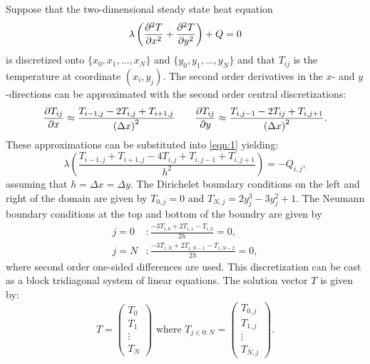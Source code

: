 \documentclass[reqno, 12pt]{amsart}
\begin{document}
    \noindent Suppose that the two-dimensional steady state heat equation
    \begin{equation}
        \lambda\left(\pdifftwo[T]{x} + \pdifftwo[T]{y}\right) + Q = 0 \label{eqn:1}
    \end{equation}
    is discretized onto $\{x_0, x_1, \dots, x_N\}$ and $\{y_0, y_1, \dots, y_N\}$ and that $T_{ij}$ is the temperature at coordinate $(x_i, y_j)$.
    The second order derivatives in the $x$- and $y$-directions can be approximated with the second order central discretizations:
    \begin{equation*}
        \pdiff[T_{ij}]{x} \approx \frac{T_{i-1,j} - 2 T_{i,j} + T_{i + 1,j}}{\left(\Delta x\right)^2}
        \qquad
        \pdiff[T_{ij}]{y} \approx \frac{T_{i, j-1} - 2T_{ij} + T_{i, j + 1}}{\left(\Delta x\right)^2}.
    \end{equation*}
    These approximations can be substituted into \cref{eqn:1} yielding:
    \begin{equation*}
        \lambda\left(\frac{T_{i-1,j} + T_{i + 1,j} - 4T_{i,j} + T_{i,j-1} + T_{i,j + 1}}{h^2}\right) = -Q_{i,j},
    \end{equation*}
    assuming that $h = \Delta x = \Delta y$.
    The Dirichelet boundary conditions on the left and right of the domain are given by $T_{0,j} = 0$ and $T_{N,j} = 2y_j^3 - 3y_j^2 + 1$.
    The Neumann boundary conditions at the top and bottom of the boundry are given by
    \begin{align*}
        j = 0&: \frac{-3T_{i,0} + 2T_{i,1} - T_{i,2}}{2h}= 0, \\
        j = N&: \frac{-3T_{i,N} + 2T_{i,N-1} - T_{i,N-2}}{2h} = 0,
    \end{align*}
    where second order one-sided differences are used.
    This discretization can be cast as a block tridiagonal system of linear equations.
    The solution vector $T$ is given by:
    \begin{equation*}
        T = \begin{pmatrix} T_0 \\ T_1 \\ \vdots \\ T_N \end{pmatrix}
        \text{ where }
        T_{j\in 0:N} = \begin{pmatrix} T_{0,j} \\ T_{1,j} \\ \vdots \\ T_{N,j} \end{pmatrix}.
    \end{equation*}
\end{document}
